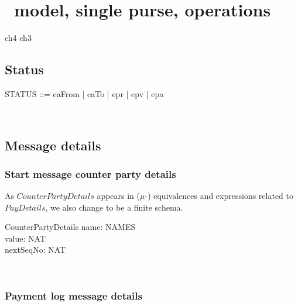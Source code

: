\chapter{\Betw\ model, single purse, operations}\label{ch4}

\begin{zsection}
  \SECTION ch4 \parents ch3
\end{zsection}

\section{Status}

\begin{LFType}
\begin{zed}
   STATUS ::= eaFrom | eaTo | epr | epv | epa
\end{zed}~\end{LFType}

\section{Message details}\label{ch4.msgdetails}

\subsection{Start message counter party details}

As $CounterPartyDetails$ appears in ($\mu$-) equivalences
and expressions related to $PayDetails$, we also change
to be a finite schema.
%
\begin{LSDef}
\begin{schema}{CounterPartyDetails}
   name: NAMES \\
   value: NAT \\
   nextSeqNo: NAT
\end{schema}~\end{LSDef}

\subsection{Payment log message details}

